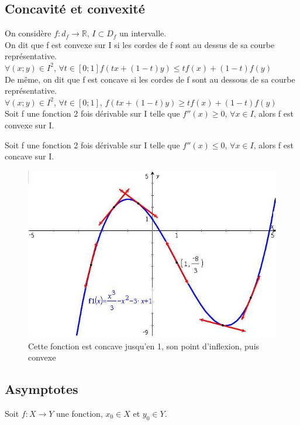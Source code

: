 \documentclass[a4paper,10pt]{book}
\newcommand{\R}{\mathbb{R}}
\begin{document}
\subsection{Concavité et convexité}
On considère $f: d_{f} \longrightarrow \R $, $I \subset D_{f}$ un intervalle.\\

On dit que f est convexe sur I si les cordes de f sont au dessus de sa courbe représentative.\\
$\forall (x;y) \in I^{2}$, $\forall t \in [0;1]
f(tx+(1-t)y) \leqslant tf(x)+(1-t)f(y)$\\

De même, on dit que f est concave si les cordes de f sont au dessous de sa courbe représentative.\\
$\forall (x;y) \in I^{2}$, $\forall t \in [0;1]$, $f(tx+(1-t)y) \geqslant tf(x)+(1-t)f(y)$\\

Soit f une fonction 2 fois dérivable sur I telle que $f''(x)\geqslant 0$, $\forall x \in I$, alors f est convexe sur I.

Soit f une fonction 2 fois dérivable sur I telle que $f''(x)\leqslant 0$, $\forall x \in I$, alors f est concave sur I.
\begin{figure}[!h] \begin{center} \includegraphics[scale=0.6]{images/016.jpg} \caption{Cette fonction est concave jusqu'en 1, son point d'inflexion, puis convexe} \end{center} \end{figure}

\subsection{Asymptotes}
Soit $f : X \longrightarrow Y$ une fonction, $x_{0} \in X$ et $y_{0} \in Y$.\\
\end{document}
